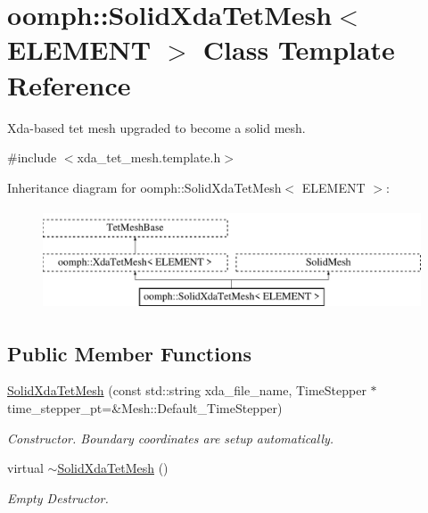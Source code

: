 \hypertarget{classoomph_1_1SolidXdaTetMesh}{}\section{oomph\+:\+:Solid\+Xda\+Tet\+Mesh$<$ E\+L\+E\+M\+E\+NT $>$ Class Template Reference}
\label{classoomph_1_1SolidXdaTetMesh}


Xda-\/based tet mesh upgraded to become a solid mesh.  




{\ttfamily \#include $<$xda\+\_\+tet\+\_\+mesh.\+template.\+h$>$}

Inheritance diagram for oomph\+:\+:Solid\+Xda\+Tet\+Mesh$<$ E\+L\+E\+M\+E\+NT $>$\+:\begin{figure}[H]
\begin{center}
\leavevmode
\includegraphics[height=3.000000cm]{classoomph_1_1SolidXdaTetMesh}
\end{center}
\end{figure}
\subsection*{Public Member Functions}
\begin{DoxyCompactItemize}
\item 
\hyperlink{classoomph_1_1SolidXdaTetMesh_a1242b23a2df9f424ec17aa2059ba116d}{Solid\+Xda\+Tet\+Mesh} (const std\+::string xda\+\_\+file\+\_\+name, Time\+Stepper $\ast$time\+\_\+stepper\+\_\+pt=\&Mesh\+::\+Default\+\_\+\+Time\+Stepper)
\begin{DoxyCompactList}\small\item\em Constructor. Boundary coordinates are setup automatically. \end{DoxyCompactList}\item 
virtual \hyperlink{classoomph_1_1SolidXdaTetMesh_a9425d53bae183deb23fb3a1019a48ca8}{$\sim$\+Solid\+Xda\+Tet\+Mesh} ()
\begin{DoxyCompactList}\small\item\em Empty Destructor. \end{DoxyCompactList}\end{DoxyCompactItemize}


